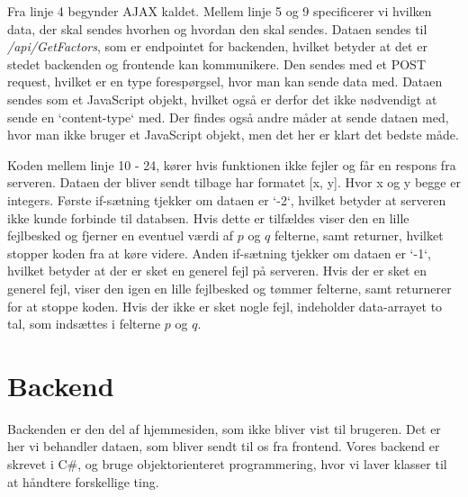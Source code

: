 \documentclass[a4paper,12pt]{extarticle}
\begin{document}
    \medskip

    Fra linje 4 begynder AJAX kaldet.
    Mellem linje 5 og 9 specificerer vi hvilken data, der skal sendes hvorhen og hvordan den skal sendes.
    Dataen sendes til \emph{/api/GetFactors}, som er endpointet for backenden, hvilket betyder at det er stedet backenden og frontende kan kommunikere.
    Den sendes med et POST request, hvilket er en type forespørgsel, hvor man kan sende data med.
    Dataen sendes som et JavaScript objekt, hvilket også er derfor det ikke nødvendigt at sende en `content-type` med.
    Der findes også andre måder at sende dataen med, hvor man ikke bruger et JavaScript objekt, men det her er klart det bedste måde.

    \medskip

    Koden mellem linje 10 - 24, kører hvis funktionen ikke fejler og får en respons fra serveren.
    Dataen der bliver sendt tilbage har formatet [x, y]. Hvor x og y begge er integers.
    Første if-sætning tjekker om dataen er `-2`, hvilket betyder at serveren ikke kunde forbinde til databsen.
    Hvis dette er tilfældes viser den en lille fejlbesked og fjerner en eventuel værdi af $p$ og $q$ felterne, samt returner, hvilket stopper koden fra at køre videre.
    Anden if-sætning tjekker om dataen er `-1`, hvilket betyder at der er sket en generel fejl på serveren.
    Hvis der er sket en generel fejl, viser den igen en lille fejlbesked og tømmer felterne, samt returnerer for at stoppe koden.
    Hvis der ikke er sket nogle fejl, indeholder data-arrayet to tal, som indsættes i felterne $p$ og $q$.


    \section{Backend}\label{sec:backend}
    Backenden er den del af hjemmesiden, som ikke bliver vist til brugeren.
    Det er her vi behandler dataen, som bliver sendt til os fra frontend.
    Vores backend er skrevet i C\#, og bruge objektorienteret programmering, hvor vi laver klasser til at håndtere forskellige ting.
\end{document}
